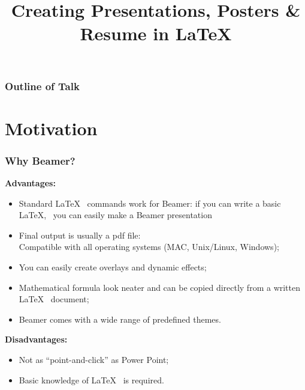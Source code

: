 \documentclass[[newPxFont]{beamer}
\author[{\tiny Dr. D. Aravinthan @ Online Training Programme on \LaTeX }]
{%
   \texorpdfstring{
        \begin{columns}
            \column{.45\linewidth}
            \centering
            \RBox{\textbf{\Large Dr. D. Aravinthan}}
          \end{columns}
        \begin{center}
        \begin{columns}
          \column{0.90\linewidth}
            \centering
            \begin{footnotesize}
            Guest Faculty\\
            Department of Physics\\
            Central University of Tamilnadu\\
		Thiruvarur - 610 015
            \end{footnotesize}\\
		     \vspace{1cm}
		     \begin{columns}
            \column{.75\linewidth}
            \centering
            \RBox{\textbf{Summer Online Training Programme on \LaTeX}}
        \end{columns}
        \vspace{0.2cm}
         \begin{footnotesize}
          June  18, 2020\\
                   \vspace{0.25cm}
         \textbf{Jamal Mohamed College (Autonomous)\\
          Tiruchirappalli – 620 020.}              
          \end{footnotesize}\\
        \end{columns}
        \end{center}
           }
   {}
}
\title[{\tiny Creating PPTs, Posters \& Resume in \LaTeX~~\insertframenumber/\inserttotalframenumber}]{\textbf{Creating Presentations, Posters \& Resume in \LaTeX}}
\begin{document}
\begin{frame}[plain]
\vspace{0.5cm}
\maketitle
\end{frame}
\section[Outline]{}	%
\begin{frame}
\frametitle{Outline of Talk}
\tableofcontents[pausesections]
\end{frame}
\iftrue
\section{Motivation}	%
\begin{frame}
\frametitle{Why Beamer?}
\begin{small}
\textbf{Advantages:}
\begin{itemize}
  \item Standard \LaTeX~ commands work for Beamer: if you can write a basic \LaTeX,~ you can easily make a Beamer presentation
\pause
\item Final output is usually a {\color{red}pdf file:\\
 Compatible with all operating systems (MAC, Unix/Linux, Windows);}
\pause
\item You can easily create overlays and dynamic effects;
\pause
\item Mathematical formula look neater and can be copied directly from a written \LaTeX~ document;
\pause
\item Beamer comes with a wide range of predefined themes.
\pause
\end{itemize}
\textbf{Disadvantages:}
\begin{itemize}
  \item Not as “point-and-click” as Power Point;
\pause
\item Basic knowledge of \LaTeX~ is required.
\end{itemize}
\end{small}
\end{frame}
\end{document}

